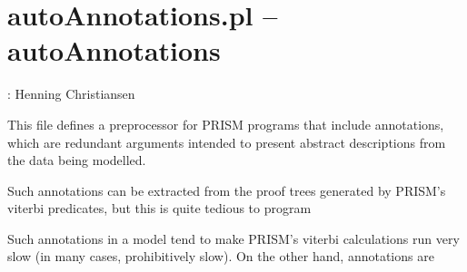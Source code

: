 


\section{autoAnnotations.pl -- autoAnnotations}

\label{sec:autoAnnotations}

\begin{tags}
: Henning Christiansen
\end{tags}

This file defines a preprocessor for PRISM programs that include
annotations, which are redundant arguments intended to present
abstract descriptions from the data being modelled.

Such annotations can be extracted from the proof trees generated
by PRISM's viterbi predicates, but this is quite tedious to program

Such annotations in a model tend to make PRISM's viterbi calculations run very slow
(in many cases, prohibitively slow).
On the other hand, annotations are

